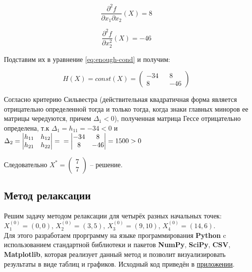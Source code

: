 \begin{equation*}
	\frac{\partial^2 f}{\partial x_1 \partial x_2}(X) = 8
\end{equation*}

\begin{equation*}
	\frac{\partial^2 f}{\partial x^2_2}(X) = - 46
\end{equation*}

Подставим их в уравнение \ref{eq:enough-cond} и получим:

\begin{equation*}
	H(X) = const(X) =
	\begin{pmatrix}
		-34 && 8
		\\
		8 && -46
	\end{pmatrix}
\end{equation*}

Согласно критерию Сильвестра (действительная квадратичная форма является отрицательно определенной тогда и только тогда, когда знаки главных миноров ее матрицы чередуются, причем $\Delta_1 < 0$), полученная матрица Гессе отрицательно определена, т.к $\Delta_1 = h_{11} = -34 < 0$ и $\Delta_2 =%
\begin{vmatrix}%
	h_{11} & h_{12}%
	\\
	h_{21} & h_{22}
\end{vmatrix} = \\
=
\begin{vmatrix}%
	-34 & 8%
	\\
	8 & -46
\end{vmatrix} =1500 > 0$

Следовательно $X^* = \begin{pmatrix}
	7
	\\
	7
\end{pmatrix}$ -- решение.

\subsection{Метод релаксации}

Решим задачу методом релаксации для четырёх разных начальных точек: $X_1^{(0)} = (0, 0)$, $X_2^{(0)} = (3, 5)$, $X_3^{(0)} = (9, 10)$, $X_4^{(0)} = (14, 6)$.\\

Для этого разработаем прорграмму на языке программирования \textbf{Python} c использованием стандартной библиотеки и пакетов \textbf{NumPy}, \textbf{SciPy}, \textbf{CSV}, \textbf{Matplotlib}, которая реализует данный метод и позволит визуализировать результаты в виде таблиц и графиков.  Исходный код приведён в \hyperref[sec:application]{приложении}.\\

